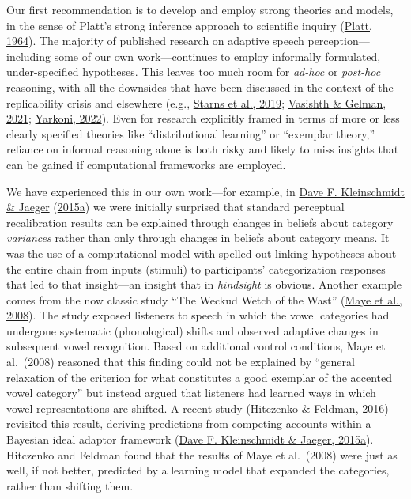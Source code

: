 \documentclass[
  11pt,
  english,
  man,floatsintext]{apa6}
\begin{document}
Our first recommendation is to develop and employ strong theories and models, in the sense of Platt's strong inference approach to scientific inquiry (\protect\hyperlink{ref-platt1964}{Platt, 1964}). The majority of published research on adaptive speech perception---including some of our own work---continues to employ informally formulated, under-specified hypotheses. This leaves too much room for \emph{ad-hoc} or \emph{post-hoc} reasoning, with all the downsides that have been discussed in the context of the replicability crisis and elsewhere (e.g., \protect\hyperlink{ref-starns2019}{Starns et al., 2019}; \protect\hyperlink{ref-vasishth2021}{Vasishth \& Gelman, 2021}; \protect\hyperlink{ref-yarkoni2022}{Yarkoni, 2022}). Even for research explicitly framed in terms of more or less clearly specified theories like ``distributional learning'' or ``exemplar theory,'' reliance on informal reasoning alone is both risky and likely to miss insights that can be gained if computational frameworks are employed.

We have experienced this in our own work---for example, in \protect\hyperlink{ref-kleinschmidt-jaeger2015}{Dave F. Kleinschmidt \& Jaeger} (\protect\hyperlink{ref-kleinschmidt-jaeger2015}{2015a}) we were initially surprised that standard perceptual recalibration results can be explained through changes in beliefs about category \emph{variances} rather than only through changes in beliefs about category means. It was the use of a computational model with spelled-out linking hypotheses about the entire chain from inputs (stimuli) to participants' categorization responses that led to that insight---an insight that in \emph{hindsight} is obvious. Another example comes from the now classic study ``The Weckud Wetch of the Wast'' (\protect\hyperlink{ref-maye2008}{Maye et al., 2008}). The study exposed listeners to speech in which the vowel categories had undergone systematic (phonological) shifts and observed adaptive changes in subsequent vowel recognition. Based on additional control conditions, Maye et al.~(2008) reasoned that this finding could not be explained by ``general relaxation of the criterion for what constitutes a good exemplar of the accented vowel category'' but instead argued that listeners had learned ways in which vowel representations are shifted. A recent study (\protect\hyperlink{ref-hitczenko-feldman2016}{Hitczenko \& Feldman, 2016}) revisited this result, deriving predictions from competing accounts within a Bayesian ideal adaptor framework (\protect\hyperlink{ref-kleinschmidt-jaeger2015}{Dave F. Kleinschmidt \& Jaeger, 2015a}). Hitczenko and Feldman found that the results of Maye et al.~(2008) were just as well, if not better, predicted by a learning model that expanded the categories, rather than shifting them.
\end{document}
